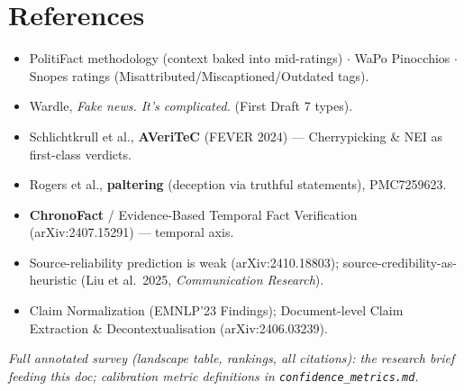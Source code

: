 \documentclass[11pt]{article}
\begin{document}
\hrulefill

\section*{References}

\begin{itemize}[leftmargin=1.4em]
  \item PolitiFact methodology (context baked into mid-ratings) $\cdot$ WaPo Pinocchios
    $\cdot$ Snopes ratings (Misattributed/Miscaptioned/Outdated tags).
  \item Wardle, \emph{Fake news. It's complicated.} (First Draft 7 types).
  \item Schlichtkrull et al., \textbf{AVeriTeC} (FEVER 2024) --- Cherrypicking \& NEI as
    first-class verdicts.
  \item Rogers et al., \textbf{paltering} (deception via truthful statements), PMC7259623.
  \item \textbf{ChronoFact} / Evidence-Based Temporal Fact Verification (arXiv:2407.15291)
    --- temporal axis.
  \item Source-reliability prediction is weak (arXiv:2410.18803);
    source-credibility-as-heuristic (Liu et al.\ 2025, \emph{Communication Research}).
  \item Claim Normalization (EMNLP'23 Findings); Document-level Claim Extraction \&
    Decontextualisation (arXiv:2406.03239).
\end{itemize}

\emph{Full annotated survey (landscape table, rankings, all citations): the research brief
feeding this doc; calibration metric definitions in \texttt{confidence\_metrics.md}.}
\end{document}
